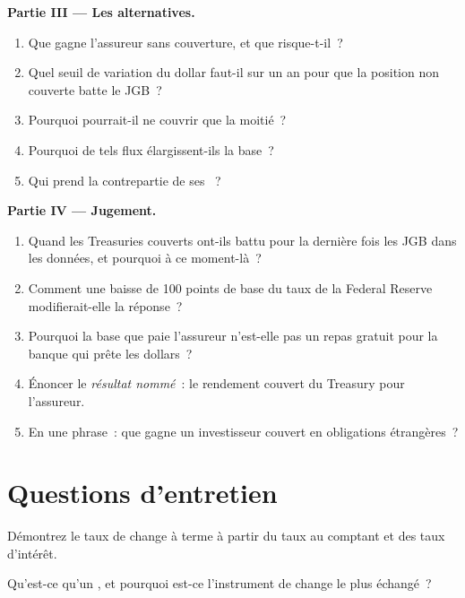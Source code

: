 \begin{problem}
\medskip\noindent\textbf{Partie III --- Les alternatives.}
\begin{enumerate}[resume]
\item Que gagne l'assureur sans couverture, et que risque-t-il~?
\item Quel seuil de variation du dollar faut-il sur un an pour que la position non couverte batte le JGB~?
\item Pourquoi pourrait-il ne couvrir que la moitié~?
\item Pourquoi de tels flux élargissent-ils la base~?
\item Qui prend la contrepartie de ses ~?
\end{enumerate}

\medskip\noindent\textbf{Partie IV --- Jugement.}
\begin{enumerate}[resume]
\item Quand les Treasuries couverts ont-ils battu pour la dernière fois les JGB dans les données, et pourquoi à ce moment-là~?
\item Comment une baisse de 100 points de base du taux de la Federal Reserve modifierait-elle la réponse~?
\item Pourquoi la base que paie l'assureur n'est-elle pas un repas gratuit pour la banque qui prête les dollars~?
\item Énoncer le \emph{résultat nommé}~: le rendement couvert du Treasury pour l'assureur.
\item En une phrase~: que gagne un investisseur couvert en obligations étrangères~?
\end{enumerate}
\end{problem}

\section{Questions d'entretien}

\begin{interviewq}\label{iq:m2:fx-swaps-forwards-and-the-cross-currency-basis:1}
Démontrez le taux de change à terme à partir du taux au comptant et des taux d'intérêt.
\end{interviewq}

\begin{interviewq}\label{iq:m2:fx-swaps-forwards-and-the-cross-currency-basis:2}
Qu'est-ce qu'un , et pourquoi est-ce l'instrument de change le plus échangé~?
\end{interviewq}

